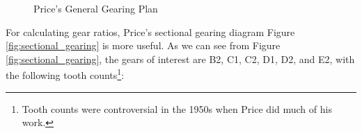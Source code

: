 \documentclass[11pt, oneside]{article}   	%
\theoremstyle{definition}
\begin{document}
\begin{figure}[H]
\caption{Price's General Gearing Plan \cite{gears_from_the_greeks}}
\label{fig:general_gearing_plan}
\end{figure}

\bigskip
\noindent
For calculating gear ratios,  Price's sectional gearing diagram Figure \ref{fig:sectional_gearing} is more useful. As we can see from Figure \ref{fig:sectional_gearing}, the gears of interest
are B2, C1, C2, D1, D2, and E2, with the following tooth counts\footnote{Tooth counts were controversial in the 1950s when Price did much of his work.}:
\end{document}

